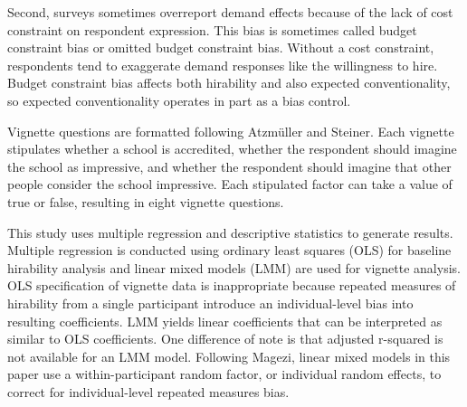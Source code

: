 \documentclass[review]{elsarticle}
\begin{document}
Second, surveys sometimes overreport demand effects because of the lack of cost constraint on respondent expression.
This bias is sometimes called budget constraint bias or omitted budget constraint bias\cite{ahlheim1998contingent, pachali2020omitted}.
Without a cost constraint, respondents tend to exaggerate demand responses like the willingness to hire.
Budget constraint bias affects both hirability and also expected conventionality,
so expected conventionality operates in part as a bias control.

Vignette questions are formatted following Atzm{\"u}ller and Steiner\cite{atzmuller2010experimental}.
Each vignette stipulates whether a school is accredited,
whether the respondent should imagine the school as impressive,
and whether the respondent should imagine that other people consider the school impressive.
Each stipulated factor can take a value of true or false,
resulting in eight vignette questions.

This study uses multiple regression and descriptive statistics to generate results.
Multiple regression is conducted using ordinary least squares (OLS)
for baseline hirability analysis
and linear mixed models (LMM)
are used for vignette analysis.
OLS specification of vignette data is inappropriate because repeated measures of hirability
from a single participant introduce an individual-level bias into resulting coefficients.
LMM yields linear coefficients that can be interpreted as similar to OLS coefficients.
One difference of note is that adjusted r-squared is not available for an LMM model.
Following Magezi\cite{magezi2015linear},
linear mixed models in this paper use a within-participant random factor,
or individual random effects,
to correct for individual-level repeated measures bias.
\end{document}
